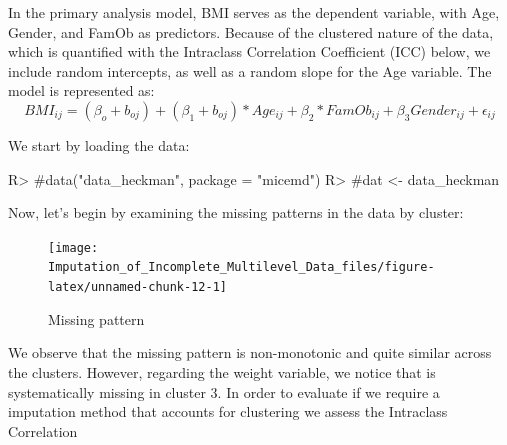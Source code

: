 \documentclass[
]{jss}
\begin{document}
In the primary analysis model, BMI serves as the dependent variable,
with Age, Gender, and FamOb as predictors. Because of the clustered
nature of the data, which is quantified with the Intraclass Correlation
Coefficient (ICC) below, we include random intercepts, as well as a
random slope for the Age variable. The model is represented as:
\begin{equation}
\label{eqn:main}
BMI_{ij}= (\beta_{o}+ b_{oj} ) + (\beta_{1}+ b_{oj})* Age_{ij} + \beta_{2}*FamOb_{ij}+ \beta_{3}Gender_{ij} + \epsilon_{ij}
\end{equation}

We start by loading the data:

\begin{CodeChunk}
\begin{CodeInput}
R> #data("data_heckman", package = "micemd")
R> #dat <- data_heckman
\end{CodeInput}
\end{CodeChunk}

Now, let's begin by examining the missing patterns in the data by
cluster:

\begin{CodeChunk}
\begin{figure}

{\centering \texttt{[image: Imputation\_of\_Incomplete\_Multilevel\_Data\_files/figure-latex/unnamed-chunk-12-1]} 

}

\caption[Missing pattern]{Missing pattern}\label{fig:unnamed-chunk-12}
\end{figure}
\end{CodeChunk}

We observe that the missing pattern is non-monotonic and quite similar
across the clusters. However, regarding the weight variable, we notice
that is systematically missing in cluster 3. In order to evaluate if we
require a imputation method that accounts for clustering we assess the
Intraclass Correlation
\end{document}
